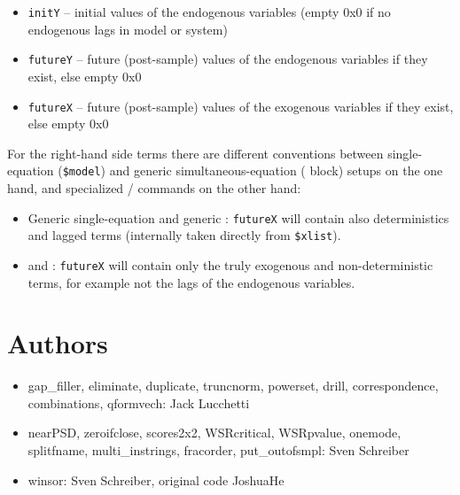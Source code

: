 \documentclass[11pt,english]{article}
\begin{document}
\begin{itemize}
\item \texttt{initY} -- initial values of the endogenous variables
  (empty 0x0 if no endogenous lags in model or system)
\item \texttt{futureY} -- future (post-sample) values of the endogenous
  variables if they exist, else empty 0x0
\item \texttt{futureX} -- future (post-sample) values of the exogenous
  variables if they exist, else empty 0x0
\end{itemize}

For the right-hand side terms there are different conventions between
single-equation (\texttt{\$model}) and generic simultaneous-equation
( block) setups on the one hand, and specialized   /
 commands on the other hand:
 
\begin{itemize}
\item Generic single-equation and generic : 
  \texttt{futureX} will contain also deterministics and lagged terms 
  (internally taken directly from \texttt{\$xlist}).
 
\item {} and : 
  \texttt{futureX} will contain only the truly exogenous and 
   non-deterministic terms, for example not the lags of the 
   endogenous variables.
\end{itemize}

\section{Authors}
\begin{itemize}
\item gap\_filler, eliminate, duplicate, truncnorm, powerset,
  drill, correspondence, combinations, qformvech: Jack Lucchetti

\item nearPSD, zeroifclose, scores2x2, WSRcritical, WSRpvalue, onemode,
splitfname, multi\_instrings, fracorder, put\_outofsmpl:
Sven Schreiber

\item winsor: Sven Schreiber, original code JoshuaHe


\end{itemize}
\end{document}
